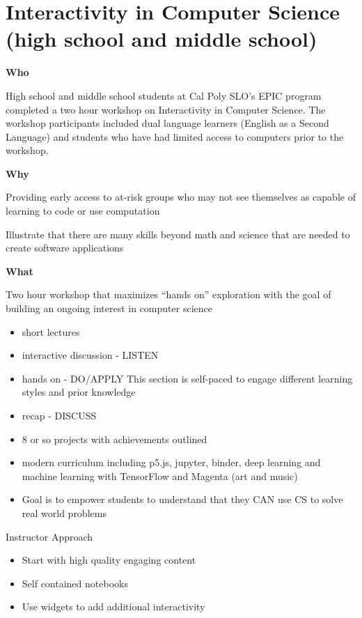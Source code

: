 \documentclass[]{book}
\providecommand{\tightlist}{%
  \setlength{\itemsep}{0pt}\setlength{\parskip}{0pt}}
\begin{document}
\section{Interactivity in Computer Science (high school and middle
school)}\label{interactivity-in-computer-science-high-school-and-middle-school}

\textbf{Who}

High school and middle school students at Cal Poly SLO's EPIC program
completed a two hour workshop on Interactivity in Computer Science. The
workshop participants included dual language learners (English as a
Second Language) and students who have had limited access to computers
prior to the workshop.

\textbf{Why}

Providing early access to at-risk groups who may not see themselves as
capable of learning to code or use computation

Illustrate that there are many skills beyond math and science that are
needed to create software applications

\textbf{What}

Two hour workshop that maximizes ``hands on'' exploration with the goal
of building an ongoing interest in computer science

\begin{itemize}
\tightlist
\item
  short lectures
\item
  interactive discussion - LISTEN
\item
  hands on - DO/APPLY This section is self-paced to engage different
  learning styles and prior knowledge
\item
  recap - DISCUSS
\item
  8 or so projects with achievements outlined
\item
  modern curriculum including p5.js, jupyter, binder, deep learning and
  machine learning with TensorFlow and Magenta (art and music)
\item
  Goal is to empower students to understand that they CAN use CS to
  solve real world problems
\end{itemize}

Instructor Approach

\begin{itemize}
\tightlist
\item
  Start with high quality engaging content
\item
  Self contained notebooks
\item
  Use widgets to add additional interactivity
\end{itemize}
\end{document}
